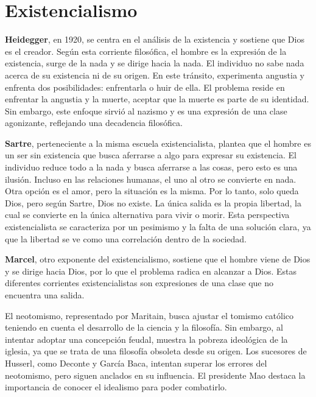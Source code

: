 \documentclass[
  letterpaper,
  DIV=11,
  numbers=noendperiod]{scrartcl}
\begin{document}
\hypertarget{existencialismo}{%
\section{Existencialismo}\label{existencialismo}}

\textbf{Heidegger}, en 1920, se centra en el análisis de la existencia y
sostiene que Dios es el creador. Según esta corriente filosófica, el
hombre es la expresión de la existencia, surge de la nada y se dirige
hacia la nada. El individuo no sabe nada acerca de su existencia ni de
su origen. En este tránsito, experimenta angustia y enfrenta dos
posibilidades: enfrentarla o huir de ella. El problema reside en
enfrentar la angustia y la muerte, aceptar que la muerte es parte de su
identidad. Sin embargo, este enfoque sirvió al nazismo y es una
expresión de una clase agonizante, reflejando una decadencia filosófica.

\textbf{Sartre}, perteneciente a la misma escuela existencialista,
plantea que el hombre es un ser sin existencia que busca aferrarse a
algo para expresar su existencia. El individuo reduce todo a la nada y
busca aferrarse a las cosas, pero esto es una ilusión. Incluso en las
relaciones humanas, el uno al otro se convierte en nada. Otra opción es
el amor, pero la situación es la misma. Por lo tanto, solo queda Dios,
pero según Sartre, Dios no existe. La única salida es la propia
libertad, la cual se convierte en la única alternativa para vivir o
morir. Esta perspectiva existencialista se caracteriza por un pesimismo
y la falta de una solución clara, ya que la libertad se ve como una
correlación dentro de la sociedad.

\textbf{Marcel}, otro exponente del existencialismo, sostiene que el
hombre viene de Dios y se dirige hacia Dios, por lo que el problema
radica en alcanzar a Dios. Estas diferentes corrientes existencialistas
son expresiones de una clase que no encuentra una salida.

El neotomismo, representado por Maritain, busca ajustar el tomismo
católico teniendo en cuenta el desarrollo de la ciencia y la filosofía.
Sin embargo, al intentar adoptar una concepción feudal, muestra la
pobreza ideológica de la iglesia, ya que se trata de una filosofía
obsoleta desde su origen. Los sucesores de Husserl, como Deconte y
García Baca, intentan superar los errores del neotomismo, pero siguen
anclados en su influencia. El presidente Mao destaca la importancia de
conocer el idealismo para poder combatirlo.
\end{document}
